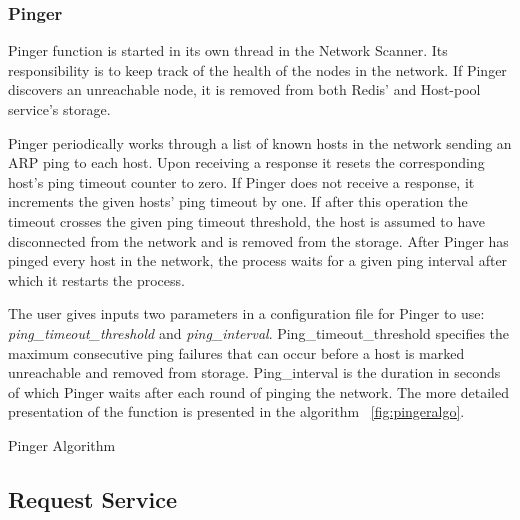 \subsubsection{Pinger} \label{pinger}

Pinger function is started in its own thread in the Network Scanner. Its responsibility is to keep track of the health of the nodes in the network. If Pinger discovers an unreachable node, it is removed from both Redis' and Host-pool service's storage.

Pinger periodically works through a list of known hosts in the network sending an ARP ping to each host. Upon receiving a response it resets the corresponding host's ping timeout counter to zero. If Pinger does not receive a response, it increments the given hosts' ping timeout by one. If after this operation the timeout crosses the given ping timeout threshold, the host is assumed to have disconnected from the network and is removed from the storage. After Pinger has pinged every host in the network, the process waits for a given ping interval after which it restarts the process.

The user gives inputs two parameters in a configuration file for Pinger to use: \textit{ping\_timeout\_threshold} and \textit{ping\_interval}. Ping\_timeout\_threshold specifies the maximum consecutive ping failures that can occur before a host is marked unreachable and removed from storage. Ping\_interval is the duration in seconds of which Pinger waits after each round of pinging the network. The more detailed presentation of the function is presented in the algorithm ~\ref{fig:pingeralgo}.

\begin{algorithm}[H]
\label{fig:pingeralgo}
\begin{center}
\end{center}


\caption{Pinger Algorithm}

\end{algorithm}

\subsection{Request Service} \label{requestservice}

